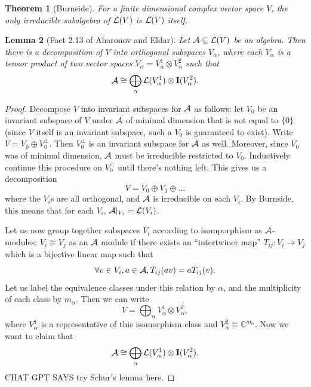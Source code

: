 \documentclass[12pt]{article}
\theoremstyle{plain}
\newtheorem{theorem}{Theorem}[section]
\newtheorem{lemma}[theorem]{Lemma}
\begin{document}
\begin{theorem}[Burnside]
For a finite dimensional complex vector space $V$, the only irreducible subalgebra of $\mathcal{L}(V)$ is $\mathcal{L}(V)$ itself.
\end{theorem}

\begin{lemma}[Fact 2.13 of Aharonov and Eldar]
    Let $\mathcal{A} \subseteq \mathcal{L}(V)$ be an algebra. Then there is a decomposition of $V$ into orthogonal subspaces $V_\alpha$, where each $V_\alpha$ is a tensor product of two vector spaces $V_\alpha = V^1_\alpha \otimes V^2_\alpha$ such that
    \[ \mathcal{A} \cong \bigoplus_{\alpha} \mathcal{L}(V^1_\alpha) \otimes \mathbf{I}(V^2_\alpha). \]
    
\end{lemma}
\begin{proof}
    Decompose $V$ into invariant subspaces for $\mathcal{A}$ as follows: let $V_0$ be an invariant subspace of $V$ under $\mathcal{A}$ of minimal dimension that is not equal to $\{0\}$ (since $V$ itself is an invariant subspace, such a $V_0$ is guaranteed to exist). Write $V = V_0 \oplus V_0^\perp$. Then $V_0^\perp$ is an invariant subspace for $\mathcal{A}$ as well. Moreover, since $V_0$ was of minimal dimension, $\mathcal{A}$ must be irreducible restricted to $V_0$. Inductively continue this procedure on $V_0^\perp$ until there's nothing left. This gives us a decomposition
    \[ V = V_0 \oplus V_1 \oplus \dots \]
    where the $V_i$s are all orthogonal, and $\mathcal{A}$ is irreducible on each $V_i$. By Burnside, this means that for each $V_i$, $\mathcal{A}|_{V_i} = \mathcal{L}(V_i)$. 

    Let us now group together subspaces $V_i$ according to isomporphism as $\mathcal{A}$-modules: $V_i \cong V_j$ as an $\mathcal{A}$ module if there exists an ``intertwiner map'' $T_{ij}: V_i \to V_j $ which is a bijective linear map such that 
    \[ \forall v \in V_i, a \in \mathcal{A}, T_{ij}(a v) = a T_{ij}(v).\] Let us label the equivalence classes under this relation by $\alpha$, and the multiplicity of each class by $m_\alpha$. Then we can write
    \[ V = \bigoplus_\alpha V^1_\alpha \otimes V^2_\alpha, \]
    where $V^1_\alpha$ is a representative of this isomorphism class and $V^2_\alpha \cong \mathbb{C}^{m_\alpha}$. Now we want to claim that
    \[ \mathcal{A} \cong \bigoplus_\alpha \mathcal{L}(V^1_\alpha) \otimes \mathbf{I}(V^2_\alpha).\]
    CHAT GPT SAYS try Schur's lemma here. 





\end{proof}
\end{document}
